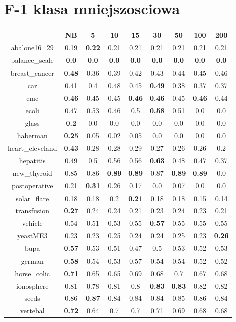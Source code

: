 \documentclass{article}%
\begin{document}
%
\section*{F{-}1 klasa mniejszosciowa}%
\begin{tabular}{c|cccccccc}%
\hline%
&NB&5&10&15&30&50&100&200\\%
\hline%
abalone16\_29&0.19&\textbf{0.22}&0.21&0.21&0.21&0.21&0.21&0.21\\%
\hline%
balance\_scale&\textbf{0.0}&\textbf{0.0}&\textbf{0.0}&\textbf{0.0}&\textbf{0.0}&\textbf{0.0}&\textbf{0.0}&\textbf{0.0}\\%
\hline%
breast\_cancer&\textbf{0.48}&0.36&0.39&0.42&0.43&0.44&0.45&0.46\\%
\hline%
car&0.41&0.4&0.48&0.45&\textbf{0.49}&0.38&0.37&0.37\\%
\hline%
cmc&\textbf{0.46}&0.45&0.45&\textbf{0.46}&\textbf{0.46}&0.45&\textbf{0.46}&0.44\\%
\hline%
ecoli&0.47&0.53&0.46&0.5&\textbf{0.58}&0.51&0.0&0.0\\%
\hline%
glass&\textbf{0.2}&0.0&0.0&0.0&0.0&0.0&0.0&0.0\\%
\hline%
haberman&\textbf{0.25}&0.05&0.02&0.05&0.0&0.0&0.0&0.0\\%
\hline%
heart\_cleveland&\textbf{0.43}&0.28&0.28&0.29&0.27&0.26&0.26&0.2\\%
\hline%
hepatitis&0.49&0.5&0.56&0.56&\textbf{0.63}&0.48&0.47&0.37\\%
\hline%
new\_thyroid&0.85&0.86&\textbf{0.89}&\textbf{0.89}&0.87&\textbf{0.89}&\textbf{0.89}&0.0\\%
\hline%
postoperative&0.21&\textbf{0.31}&0.26&0.17&0.0&0.07&0.0&0.0\\%
\hline%
solar\_flare&0.18&0.18&0.2&\textbf{0.21}&0.18&0.18&0.15&0.14\\%
\hline%
transfusion&\textbf{0.27}&0.24&0.24&0.21&0.23&0.24&0.23&0.21\\%
\hline%
vehicle&0.54&0.51&0.53&0.55&\textbf{0.57}&0.55&0.55&0.55\\%
\hline%
yeastME3&0.23&0.23&0.25&0.24&0.24&0.25&0.23&\textbf{0.26}\\%
\hline%
bupa&\textbf{0.57}&0.53&0.51&0.47&0.5&0.53&0.52&0.53\\%
\hline%
german&\textbf{0.58}&0.54&0.53&0.57&0.54&0.54&0.52&0.52\\%
\hline%
horse\_colic&\textbf{0.71}&0.65&0.65&0.69&0.68&0.7&0.67&0.68\\%
\hline%
ionosphere&0.81&0.78&0.81&0.8&\textbf{0.83}&\textbf{0.83}&0.82&0.82\\%
\hline%
seeds&0.86&\textbf{0.87}&0.84&0.84&0.84&0.85&0.86&0.84\\%
\hline%
vertebal&\textbf{0.72}&0.64&0.7&0.7&0.71&0.69&0.68&0.68\\%
\hline%
\end{tabular}
\end{document}
